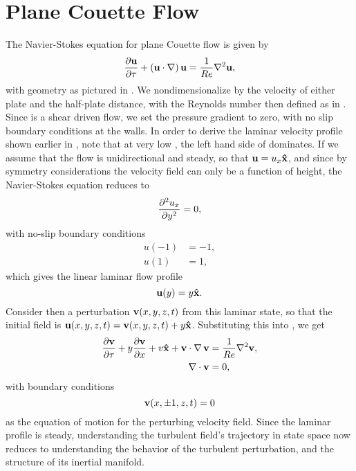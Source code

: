 \section{Plane Couette Flow}
The Navier-Stokes equation for plane Couette flow is given by 
\begin{equation}\label{eq:NSPCF}
\pder{1}{\Vector{u}}{\tau} + \paren{\Vector{u}\cdot\nabla}\Vector{u} = \frac{1}{\ReN}\nabla^2\Vector{u},
\end{equation}
with geometry as pictured in . We nondimensionalize by the velocity of either plate and the half-plate distance, with the Reynolds number then defined as in . Since \pCf is a shear driven flow, we set the pressure gradient to zero, with no slip boundary conditions at the walls. In order to derive the laminar velocity profile shown earlier in , note that at very low \ReN, the left hand side of  dominates. If we assume that the flow is unidirectional and steady, so that $\mathbf{u} = u_x \mathbf{\hat{x}}$, and since by symmetry considerations the velocity field can only be a function of height, the Navier-Stokes equation reduces to 
\begin{equation}
\pder{2}{u_x}{y} = 0,
\end{equation}
with no-slip boundary conditions 
\begin{align}
u(-1) &= -1,\\
u(1) &= 1,
\end{align}
which gives the linear laminar flow profile 
\begin{equation}
\mathbf{u}(y) = y\mathbf{\hat{x}}.
\end{equation}
Consider then a perturbation $\mathbf{v}(x,y,z,t)$ from this laminar state, so that the initial field is $\mathbf{u}(x,y,z,t) = \mathbf{v} (x,y,z,t)+ y\mathbf{\hat{x}}$. Substituting this into , we get 
\begin{align}
\pder{1}{\Vector{v}}{\tau} + y\pder{1}{\Vector{v}}{x} + v\Vector{\hat{x}} + \Vector{v}\cdot\Grad{\Vector{v}} &= \frac{1}{\ReN} \nabla^2\Vector{v},\label{eq:PertND}\\
\Div{\Vector{v}} &= 0,
\end{align}
with boundary conditions 
\begin{equation}
\mathbf{v}(x,\pm 1,z,t) = 0
\end{equation}
 as the equation of motion for the perturbing velocity field. Since the laminar profile is steady, understanding the turbulent field's trajectory in state space now reduces to understanding the behavior of the turbulent perturbation, and the structure of its inertial manifold. 
